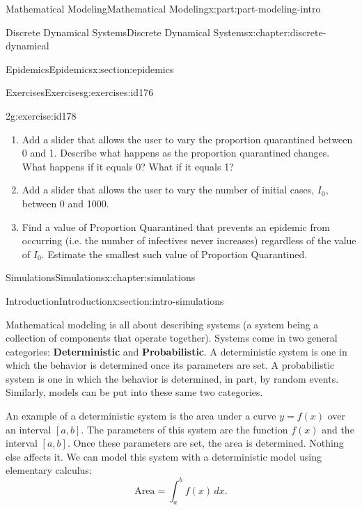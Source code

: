 \documentclass[oneside,10pt,]{book}
\newcommand{\terminology}[1]{\textbf{#1}}
\numberwithin{equation}{section}
\begin{document}
\begin{partptx}{Mathematical Modeling}{}{Mathematical Modeling}{}{}{x:part:part-modeling-intro}
\begin{chapterptx}{Discrete Dynamical Systems}{}{Discrete Dynamical Systems}{}{}{x:chapter:discrete-dynamical}
\begin{sectionptx}{Epidemics}{}{Epidemics}{}{}{x:section:epidemics}
\begin{exercises-subsection-numberless}{Exercises}{}{Exercises}{}{}{g:exercises:id176}
\begin{divisionexercise}{2}{}{}{g:exercise:id178}
\begin{enumerate}[font=\bfseries,label=(\alph*),ref=\alph*]
\item{}Add a slider that allows the user to vary the proportion quarantined between 0 and 1. Describe what happens as the proportion quarantined changes. What happens if it equals 0? What if it equals 1?%
\item{}Add a slider that allows the user to vary the number of initial cases, \(I_0\), between 0 and 1000.%
\item{}Find a value of Proportion Quarantined that prevents an epidemic from occurring (i.e. the number of infectives never increases) regardless of the value of \(I_0\). Estimate the smallest such value of Proportion Quarantined.%
\end{enumerate}
\end{divisionexercise}%
\end{exercises-subsection-numberless}
\end{sectionptx}
\end{chapterptx}
%
\typeout{************************************************}
\typeout{************************************************}
%
\begin{chapterptx}{Simulations}{}{Simulations}{}{}{x:chapter:simulations}
%
%
\typeout{************************************************}
\typeout{************************************************}
%
\begin{sectionptx}{Introduction}{}{Introduction}{}{}{x:section:intro-simulations}
\begin{introduction}{}%
Mathematical modeling is all about describing systems (a system being a collection of components that operate together). Systems come in two general categories: \terminology{Deterministic} and \terminology{Probabilistic}. A deterministic system is one in which the behavior is determined once its parameters are set. A probabilistic system is one in which the behavior is determined, in part, by random events. Similarly, models can be put into these same two categories.%
\par
An example of a deterministic system is the area under a curve \(y = f (x)\) over an interval \([a, b]\). The parameters of this system are the function \(f (x)\) and the interval \([a, b]\). Once these parameters are set, the area is determined. Nothing else affects it. We can model this system with a deterministic model using elementary calculus:%
%
\begin{equation*}
\text{Area} = \int_a^b f(x)\,dx.
\end{equation*}

\end{introduction}
\end{sectionptx}
\end{chapterptx}
\end{partptx}
\end{document}
